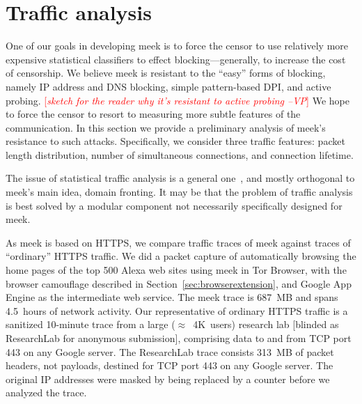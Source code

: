 \documentclass{sig-alternate}
\newcommand{\meek}{meek\xspace}
\newcommand{\lbl}{ResearchLab\xspace}
\newcommand{\note}[1]{{\textcolor{red}{[\textit{#1}]}}}
\newcommand{\vp}[1]{\note{#1 --VP}}
\begin{document}
\section{Traffic analysis}
\label{sec:trafficanalysis}

One of our goals in developing \meek is to force
the censor to use relatively more expensive statistical classifiers
to effect blocking---generally, to increase the cost of censorship.
We believe \meek is resistant to the ``easy''
forms of blocking, namely IP address and DNS blocking,
simple pattern-based DPI,
and active probing.
\vp{sketch for the reader why it's resistant to active probing}
We hope to force the censor to resort to measuring
more subtle features of the communication.
In this section we provide a preliminary analysis
of \meek's resistance to such attacks.
Specifically, we consider three traffic features:
packet length distribution,
number of simultaneous connections,
and connection lifetime.

The issue of statistical traffic analysis is a general one~\cite{trafficmorphing},
and mostly orthogonal to \meek's main idea, domain fronting.
It may be that the problem of traffic analysis is
best solved by a modular component not
necessarily specifically designed for \meek.

As \meek is based on HTTPS,
we compare traffic traces of \meek against
traces of ``ordinary'' HTTPS traffic.
We did a packet capture
of automatically browsing the home pages
of the top 500 Alexa web sites using \meek in Tor Browser,
with the browser camouflage described in Section~\ref{sec:browserextension},
and Google App Engine as the intermediate web service.
The \meek trace is 687~MB
and spans 4.5~hours of network activity.
Our representative of ordinary HTTPS traffic
is a sanitized 10-minute trace
from 
a large ($\approx$~4K~users)
research lab [blinded as \lbl for anonymous submission],
comprising data to and from TCP port 443 on any Google server.
The \lbl trace consists 313~MB of packet headers,
not payloads, destined for TCP port 443 on any Google server.
The original IP addresses were masked by being
replaced by a counter before we analyzed the trace.
\end{document}
